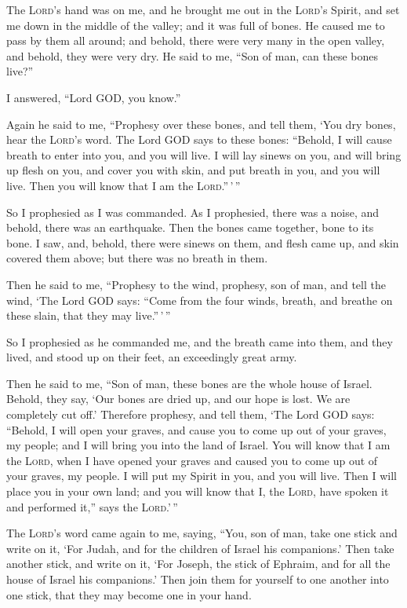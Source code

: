  The \textsc{Lord}'s hand was on me, and he brought me out
in the \textsc{Lord}'s Spirit, and set me down in the middle of the
valley; and it was full of bones.  He caused me to pass by
them all around; and behold, there were very many in the open valley,
and behold, they were very dry.  He said to me, ``Son of
man, can these bones live?''

I answered, ``Lord GOD, you know.''

 Again he said to me, ``Prophesy over these bones, and
tell them, `You dry bones, hear the \textsc{Lord}'s word. 
The Lord GOD says to these bones: ``Behold, I will cause breath to enter
into you, and you will live.  I will lay sinews on you,
and will bring up flesh on you, and cover you with skin, and put breath
in you, and you will live. Then you will know that I am the
\textsc{Lord}.''\,'\,''

 So I prophesied as I was commanded. As I prophesied,
there was a noise, and behold, there was an earthquake. Then the bones
came together, bone to its bone.  I saw, and, behold,
there were sinews on them, and flesh came up, and skin covered them
above; but there was no breath in them.

 Then he said to me, ``Prophesy to the wind, prophesy, son
of man, and tell the wind, `The Lord GOD says: ``Come from the four
winds, breath, and breathe on these slain, that they may live.''\,'\,''

 So I prophesied as he commanded me, and the breath came
into them, and they lived, and stood up on their feet, an exceedingly
great army.

 Then he said to me, ``Son of man, these bones are the
whole house of Israel. Behold, they say, `Our bones are dried up, and
our hope is lost. We are completely cut off.'  Therefore
prophesy, and tell them, `The Lord GOD says: ``Behold, I will open your
graves, and cause you to come up out of your graves, my people; and I
will bring you into the land of Israel.  You will know
that I am the \textsc{Lord}, when I have opened your graves and caused
you to come up out of your graves, my people.  I will put
my Spirit in you, and you will live. Then I will place you in your own
land; and you will know that I, the \textsc{Lord}, have spoken it and
performed it,'' says the \textsc{Lord}.'\,''

 The \textsc{Lord}'s word came again to me, saying,
 ``You, son of man, take one stick and write on it, `For
Judah, and for the children of Israel his companions.' Then take another
stick, and write on it, `For Joseph, the stick of Ephraim, and for all
the house of Israel his companions.'  Then join them for
yourself to one another into one stick, that they may become one in your
hand.

